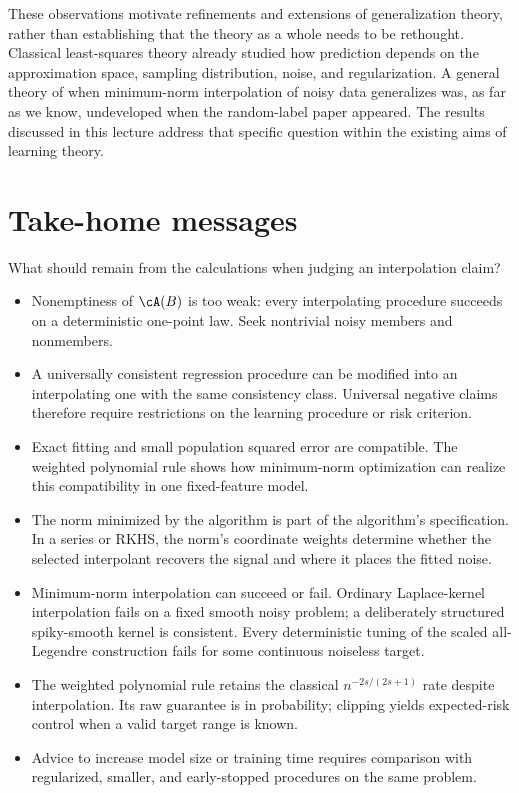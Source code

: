 \documentclass[11pt,twoside]{article}
\theoremstyle{definition}
\theoremstyle{remark}
\begin{document}
These observations motivate refinements and extensions of generalization
theory, rather than establishing that the theory as a whole needs to be
rethought. Classical least-squares theory already studied how prediction
depends on the approximation space, sampling distribution, noise, and
regularization. A general theory of when minimum-norm interpolation of
noisy data generalizes was, as far as we know, undeveloped when the
random-label paper appeared. The results discussed in this lecture address
that specific question within the existing aims of learning theory.

\section{Take-home messages}
\label{sec:take-home}

What should remain from the calculations when judging an interpolation claim?

\begin{itemize}[leftmargin=*,nosep]
\item Nonemptiness of $\cA(B)$ is too weak: every interpolating procedure
succeeds on a deterministic one-point law. Seek nontrivial noisy members and
nonmembers.
\item A universally consistent regression procedure can be modified into an
interpolating one with the same consistency class. Universal negative claims
therefore require restrictions on the learning procedure or risk criterion.
\item Exact fitting and small population squared error are compatible. The
weighted polynomial rule shows how minimum-norm optimization can realize this
compatibility in one fixed-feature model.
\item The norm minimized by the algorithm is part of the algorithm's
specification. In a series or RKHS, the norm's coordinate weights determine
whether the selected interpolant recovers the signal and
where it places the fitted noise.
\item Minimum-norm interpolation can succeed or fail. Ordinary Laplace-kernel interpolation
fails on a fixed smooth noisy problem; a deliberately structured spiky-smooth
kernel is consistent. Every deterministic tuning of the scaled all-Legendre
construction fails for some continuous noiseless target.
\item The weighted polynomial rule retains the classical
$n^{-2s/(2s+1)}$ rate despite interpolation. Its raw guarantee is in
probability; clipping yields expected-risk control when a valid target range
is known.
\item Advice to increase model size or training time requires comparison with
regularized, smaller, and early-stopped procedures on the same problem.
\end{itemize}
\end{document}
